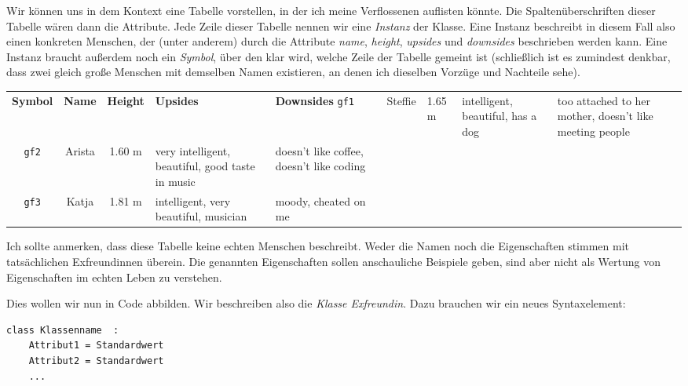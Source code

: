 Wir können uns in dem Kontext eine Tabelle vorstellen, in der ich meine Verflossenen auflisten könnte. Die Spaltenüberschriften dieser Tabelle wären dann die Attribute. Jede Zeile dieser Tabelle nennen wir eine \emph{Instanz} der Klasse. Eine Instanz beschreibt in diesem Fall also einen konkreten Menschen, der (unter anderem) durch die Attribute \emph{name}, \emph{height}, \emph{upsides} und \emph{downsides} beschrieben werden kann. Eine Instanz braucht außerdem noch ein \emph{Symbol}, über den klar wird, welche Zeile der Tabelle gemeint ist (schließlich ist es zumindest denkbar, dass zwei gleich große Menschen mit demselben Namen existieren, an denen ich dieselben Vorzüge und Nachteile sehe).

\begin{tcolorbox}[title=Eine Liste von Liebschaften]
\begin{center}
\begin{tabular}{c|ccp{.3\linewidth}p{.3\linewidth}}
	\textbf{Symbol} & \textbf{Name} & \textbf{Height} & \textbf{Upsides}                                 & \textbf{Downsides} \tabcrlf
	\texttt{gf1}    & Steffie       & 1.65 m          & intelligent, beautiful, has a dog                & too attached to her mother, 
																																																				doesn't like meeting people \\
	\texttt{gf2}    & Arista        & 1.60 m          & very intelligent, beautiful, good taste in music & doesn't like coffee, doesn't like coding \\
	\texttt{gf3}    & Katja         & 1.81 m          & intelligent, very beautiful, musician            & moody, cheated on me
\end{tabular}
\end{center}
Ich sollte anmerken, dass diese Tabelle keine echten Menschen beschreibt. Weder die Namen noch die Eigenschaften stimmen mit tatsächlichen Exfreundinnen überein. Die genannten Eigenschaften sollen anschauliche Beispiele geben, sind aber nicht als Wertung von Eigenschaften im echten Leben zu verstehen.
\end{tcolorbox}

Dies wollen wir nun in Code abbilden. Wir beschreiben also die \emph{Klasse Exfreundin}. Dazu brauchen wir ein neues Syntaxelement:
\begin{codebox}
\begin{verbatim}
class Klassenname  :
    Attribut1 = Standardwert
    Attribut2 = Standardwert
    ...
\end{verbatim}
\end{codebox}

